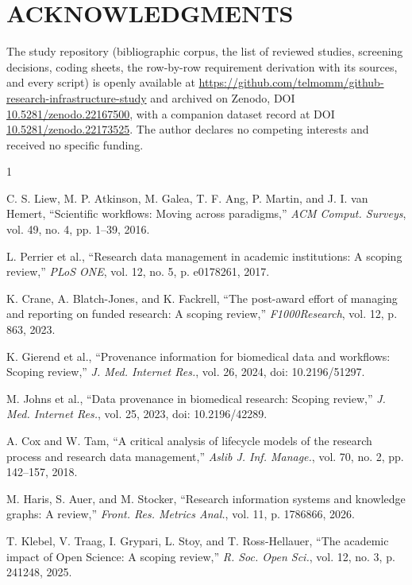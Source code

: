 \documentclass{IEEEcsmag}
\begin{document}
\section{ACKNOWLEDGMENTS}
The study repository (bibliographic corpus, the list of reviewed studies, screening decisions, coding sheets, the row-by-row requirement derivation with its sources, and every script) is openly available at \url{https://github.com/telmomm/github-research-infrastructure-study} and archived on Zenodo, DOI \href{https://doi.org/10.5281/zenodo.22167500}{10.5281/zenodo.22167500}, with a companion dataset record at DOI \href{https://doi.org/10.5281/zenodo.22173525}{10.5281/zenodo.22173525}. The author declares no competing interests and received no specific funding.

\def\refname{REFERENCES}

\begin{thebibliography}{1}

C. S. Liew, M. P. Atkinson, M. Galea, T. F. Ang, P. Martin, and J. I. van Hemert, ``Scientific workflows: Moving across paradigms,'' {\it ACM Comput. Surveys}, vol. 49, no. 4, pp. 1--39, 2016.

L. Perrier et al., ``Research data management in academic institutions: A scoping review,'' {\it PLoS ONE}, vol. 12, no. 5, p. e0178261, 2017.

K. Crane, A. Blatch-Jones, and K. Fackrell, ``The post-award effort of managing and reporting on funded research: A scoping review,'' {\it F1000Research}, vol. 12, p. 863, 2023.

K. Gierend et al., ``Provenance information for biomedical data and workflows: Scoping review,'' {\it J. Med. Internet Res.}, vol. 26, 2024, doi: 10.2196/51297.

M. Johns et al., ``Data provenance in biomedical research: Scoping review,'' {\it J. Med. Internet Res.}, vol. 25, 2023, doi: 10.2196/42289.

A. Cox and W. Tam, ``A critical analysis of lifecycle models of the research process and research data management,'' {\it Aslib J. Inf. Manage.}, vol. 70, no. 2, pp. 142--157, 2018.

M. Haris, S. Auer, and M. Stocker, ``Research information systems and knowledge graphs: A review,'' {\it Front. Res. Metrics Anal.}, vol. 11, p. 1786866, 2026.

T. Klebel, V. Traag, I. Grypari, L. Stoy, and T. Ross-Hellauer, ``The academic impact of Open Science: A scoping review,'' {\it R. Soc. Open Sci.}, vol. 12, no. 3, p. 241248, 2025.


\end{thebibliography}
\end{document}
